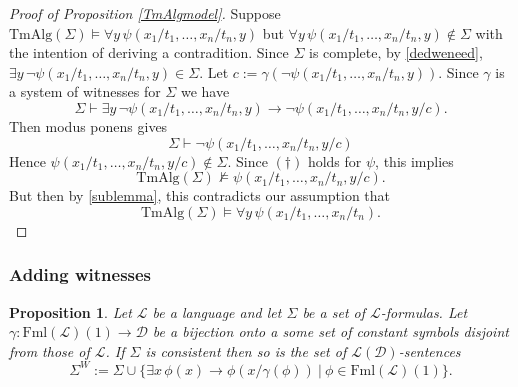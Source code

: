 \documentclass[11pt]{article}
\newcommand{\TmAlg}{\mathrm{TmAlg}}
\newcommand{\proves}{\vdash}
\newcommand{\Fml}{\textrm{Fml}}
\newtheorem{proposition}[theorem]{Proposition}
\newtheorem{definition}[theorem]{Definition}
\newcommand{\mcal}[1]{\mathcal{#1}}
\newcommand{\st}{\ \vert \ }
\begin{document}
\begin{proof}[Proof of Proposition \ref{TmAlgmodel}]
Suppose $\TmAlg(\Sigma)\models \forall y \,\psi(x_1/t_1,\ldots,x_n/t_n,y)$ but $\forall y\,\psi(x_1/t_1,\ldots,x_n/t_n,y)\notin \Sigma$ with the intention of deriving a contradition. Since $\Sigma$ is complete, by \ref{dedweneed},
$\exists y \, \neg \psi(x_1/t_1,\ldots,x_n/t_n,y)\in \Sigma$. Let $c:=\gamma(\neg \psi(x_1/t_1,\ldots,x_n/t_n,y))$. Since $\gamma$ is a system of witnesses for $\Sigma$ we have
\[\Sigma\proves \exists y \, \neg \psi(x_1/t_1,\ldots,x_n/t_n,y)\rightarrow \neg\psi(x_1/t_1,\ldots,x_n/t_n,y/c).\]
Then modus ponens gives
\[\Sigma\proves\neg\psi(x_1/t_1,\ldots,x_n/t_n,y/c)\]
Hence $\psi(x_1/t_1,\ldots,x_n/t_n,y/c)\notin\Sigma$.
Since $(\dagger)$ holds for $\psi$, this implies
\[\TmAlg(\Sigma)\nvDash\psi(x_1/t_1,\ldots,x_n/t_n,y/c).\]
But then by \ref{sublemma}, this contradicts our assumption that
\[\TmAlg(\Sigma)\models \forall y\,\psi(x_1/t_1,\ldots,x_n/t_n).\]
\end{proof}

\subsubsection*{Adding witnesses}



\begin{proposition}\label{addingwitnesses}
Let $\mcal{L}$ be a language and let $\Sigma$ be a set of $\mcal{L}$-formulas. Let $\gamma:\Fml(\mcal{L})(1)\rightarrow \mcal{D}$ be a bijection onto a some set of constant symbols disjoint from those of $\mcal{L}$. If $\Sigma$ is consistent then so is the set of $\mcal{L}(\mcal{D})$-sentences
\[\Sigma^W:=\Sigma\cup \{\exists x\,\phi(x)\rightarrow \phi(x/\gamma(\phi)) \st \phi\in\Fml(\mcal{L})(1)\}.\]
\end{proposition}
\end{document}
